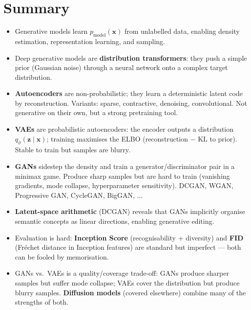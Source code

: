 \documentclass[11pt,a4paper]{article}
\theoremstyle{definition}
\theoremstyle{plain}
\theoremstyle{remark}
\begin{document}
\section{Summary}

\begin{tcolorbox}[colback=yellow!5!white,colframe=orange!80!black,title=\textbf{Take-Home Messages}]
\begin{itemize}[leftmargin=*]
    \item Generative models learn $p_{\text{model}}(\mathbf{x})$ from unlabelled data, enabling density estimation, representation learning, and sampling.
    \item Deep generative models are \textbf{distribution transformers}: they push a simple prior (Gaussian noise) through a neural network onto a complex target distribution.
    \item \textbf{Autoencoders} are non-probabilistic; they learn a deterministic latent code by reconstruction. Variants: sparse, contractive, denoising, convolutional. Not generative on their own, but a strong pretraining tool.
    \item \textbf{VAEs} are probabilistic autoencoders: the encoder outputs a distribution $q_\phi(\mathbf{z}\mid\mathbf{x})$; training maximises the ELBO (reconstruction $-$ KL to prior). Stable to train but samples are blurry.
    \item \textbf{GANs} sidestep the density and train a generator/discriminator pair in a minimax game. Produce sharp samples but are hard to train (vanishing gradients, mode collapse, hyperparameter sensitivity). DCGAN, WGAN, Progressive GAN, CycleGAN, BigGAN, $\ldots$
    \item \textbf{Latent-space arithmetic} (DCGAN) reveals that GANs implicitly organise semantic concepts as linear directions, enabling generative editing.
    \item Evaluation is hard: \textbf{Inception Score} (recognisability + diversity) and \textbf{FID} (Fréchet distance in Inception features) are standard but imperfect --- both can be fooled by memorisation.
    \item GANs vs.\ VAEs is a quality/coverage trade-off: GANs produce sharper samples but suffer mode collapse; VAEs cover the distribution but produce blurry samples. \textbf{Diffusion models} (covered elsewhere) combine many of the strengths of both.
\end{itemize}
\end{tcolorbox}


\end{document}
